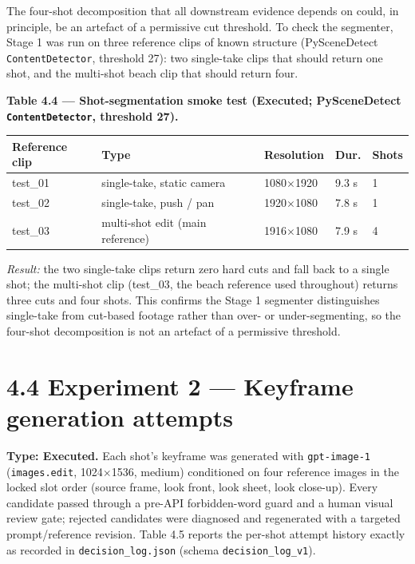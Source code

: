 \documentclass[10pt,twocolumn,letterpaper]{article}
\begin{document}
The four-shot decomposition that all downstream evidence depends on could, in principle, be an artefact of a permissive cut threshold. To check the segmenter, Stage 1 was run on three reference clips of known structure (PySceneDetect \texttt{ContentDetector}, threshold 27): two single-take clips that should return one shot, and the multi-shot beach clip that should return four.

\begin{table}[t]
\centering
{\footnotesize\textbf{\textbf{Table 4.4 --- Shot-segmentation smoke test (Executed; PySceneDetect \texttt{ContentDetector}, threshold 27).}}}\par\vspace{3pt}
\footnotesize
\begin{tabularx}{\textwidth}{l>{\RaggedRight\arraybackslash}Xlll}
\toprule
Reference clip & Type & Resolution & Dur. & Shots \\
\midrule
test\_01 & single-take, static camera & 1080$\times$1920 & 9.3 s & 1 \\
test\_02 & single-take, push / pan & 1920$\times$1080 & 7.8 s & 1 \\
test\_03 & multi-shot edit (main reference) & 1916$\times$1080 & 7.9 s & 4 \\
\bottomrule
\end{tabularx}
\end{table}

\emph{Result:} the two single-take clips return zero hard cuts and fall back to a single shot; the multi-shot clip (test\_03, the beach reference used throughout) returns three cuts and four shots. This confirms the Stage 1 segmenter distinguishes single-take from cut-based footage rather than over- or under-segmenting, so the four-shot decomposition is not an artefact of a permissive threshold.


\section*{4.4 Experiment 2 --- Keyframe generation attempts}

\textbf{Type: Executed.} Each shot's keyframe was generated with \texttt{gpt-image-1} (\texttt{images.edit}, 1024$\times$1536, medium) conditioned on four reference images in the locked slot order (source frame, look front, look sheet, look close-up). Every candidate passed through a pre-API forbidden-word guard and a human visual review gate; rejected candidates were diagnosed and regenerated with a targeted prompt/reference revision. Table 4.5 reports the per-shot attempt history exactly as recorded in \texttt{decision\_log.json} (schema \texttt{decision\_log\_v1}).
\end{document}
